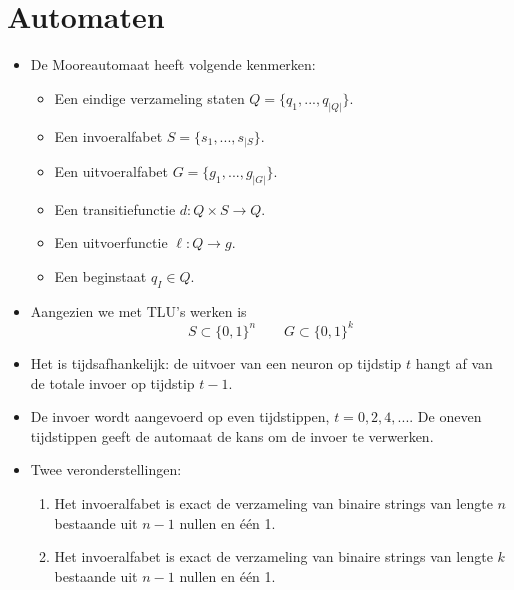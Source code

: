 \section{Automaten}
\begin{itemize}
    \item De Mooreautomaat heeft volgende kenmerken:
    \begin{itemize}
        \item Een eindige verzameling staten $Q = \{q_1, ..., q_{|Q|}\}$.
        \item Een invoeralfabet $S = \{s_1, ..., s_{|S}\}$.
        \item Een uitvoeralfabet $G = \{g_1, ..., g_{|G|}\}$.
        \item Een transitiefunctie $d : Q \times S \rightarrow Q$.
        \item Een uitvoerfunctie $\ell : Q \rightarrow g$.
        \item Een beginstaat $q_I \in Q$.
    \end{itemize}
    \item Aangezien we met TLU's werken is 
    $$S \subset \{0, 1\}^n \qquad G \subset \{0, 1\}^k$$
    \item Het is tijdsafhankelijk: de uitvoer van een neuron op tijdstip $t$ hangt af van de totale invoer op tijdstip $t - 1$. 
    \item De invoer wordt aangevoerd op even tijdstippen, $t = 0, 2, 4, ...$. De oneven tijdstippen geeft de automaat de kans om de invoer te verwerken.
    \item Twee veronderstellingen:
    \begin{enumerate}
        \item Het invoeralfabet is exact de verzameling van binaire strings van lengte $n$ bestaande uit $n - 1$ nullen en één 1.
        \item Het invoeralfabet is exact de verzameling van binaire strings van lengte $k$ bestaande uit $n - 1$ nullen en één 1.
    \end{enumerate}
\end{itemize}

